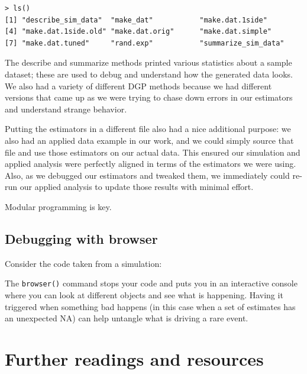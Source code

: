 \documentclass[
]{book}
\newenvironment{Shaded}{\begin{snugshade}}{\end{snugshade}}
\newcommand{\ControlFlowTok}[1]{\textcolor[rgb]{0.13,0.29,0.53}{\textbf{#1}}}
\newcommand{\FunctionTok}[1]{\textcolor[rgb]{0.13,0.29,0.53}{\textbf{#1}}}
\newcommand{\NormalTok}[1]{#1}
\newcommand{\SpecialCharTok}[1]{\textcolor[rgb]{0.81,0.36,0.00}{\textbf{#1}}}
\begin{document}
\begin{verbatim}
> ls()
[1] "describe_sim_data"  "make_dat"           "make.dat.1side"     
[4] "make.dat.1side.old" "make.dat.orig"      "make.dat.simple"
[7] "make.dat.tuned"     "rand.exp"           "summarize_sim_data"
\end{verbatim}

The describe and summarize methods printed various statistics about a sample dataset; these are used to debug and understand how the generated data looks.
We also had a variety of different DGP methods because we had different versions that came up as we were trying to chase down errors in our estimators and understand strange behavior.

Putting the estimators in a different file also had a nice additional purpose: we also had an applied data example in our work, and we could simply source that file and use those estimators on our actual data.
This ensured our simulation and applied analysis were perfectly aligned in terms of the estimators we were using.
Also, as we debugged our estimators and tweaked them, we immediately could re-run our applied analysis to update those results with minimal effort.

Modular programming is key.

\section{Debugging with browser}\label{debugging-with-browser}

Consider the code taken from a simulation:

\begin{Shaded}
\end{Shaded}

The \texttt{browser()} command stops your code and puts you in an interactive console where you can look at different objects and see what is happening.
Having it triggered when something bad happens (in this case when a set of estimates has an unexpected NA) can help untangle what is driving a rare event.

\chapter{Further readings and resources}\label{further-readings-and-resources}
\end{document}
